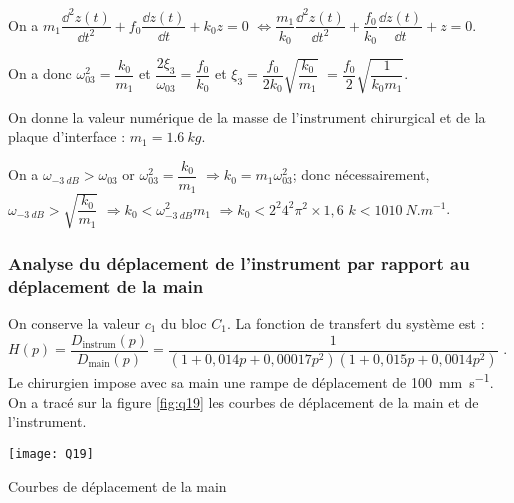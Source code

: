 \ifprof
\begin{corrige}
On a  $m_1\dfrac{\dd^2 z(t)}{\dd t^2} + f_0 \dfrac{\dd z (t)}{\dd t}+k_0 z = 0$ 
$\Leftrightarrow  \dfrac{m_1}{k_0}\dfrac{\dd^2 z(t)}{\dd t^2} + \dfrac{f_0}{k_0} \dfrac{\dd z (t)}{\dd t}+ z = 0$. 

On a donc $\omega_{03}^2=\dfrac{k_0}{m_1}$ et $\dfrac{2\xi_3}{\omega_{03}}=\dfrac{f_0}{k_0}$ et $\xi_3 =\dfrac{f_0}{2k_0}\sqrt {\dfrac{k_0}{m_1}}$ $=\dfrac{f_0}{2}\sqrt {\dfrac{1}{k_0m_1}}$.
\end{corrige}
\else
\fi

On donne la valeur numérique de la masse de l’instrument chirurgical et de la plaque d’interface : $m_1 = \SI{1,6}{kg}$.


\ifprof
\begin{corrige}
On a $ \omega_{-\SI{3}{dB}}> \omega_{03}$ or $\omega_{03}^2=\dfrac{k_0}{m_1}$ $\Rightarrow k_0= m_1 \omega_{03}^2$; donc nécessairement, $ \omega_{-\SI{3}{dB}}>\sqrt{\dfrac{k_0}{m_1}}$ $\Rightarrow k_0 <\omega_{-\SI{3}{dB}} ^2 m_1 $ $\Rightarrow k_0 <2^2 4^2 \pi^2 \times 1,6 $ $k<\SI{1010}{N.m^{-1}}$.
\end{corrige}
\else
\fi

\subsubsection*{Analyse du déplacement de l’instrument par rapport au déplacement de la main}
\ifprof
\else



On conserve la valeur $c_1$ du bloc $C_1$. La fonction de transfert du système est : $H(p)=\dfrac{D_{\text{instrum}}(p)}{D_{\text{main}}(p)}=\dfrac{1}{\left(1+0,014p+0,00017p^2 \right)\left( 1+0,015p+0,0014p^2\right)}$ .
Le chirurgien impose avec sa main une rampe de déplacement  de \SI{100}{mm.s^{-1}}. On a tracé sur la figure \ref{fig:q19} les courbes de déplacement de la main et de l’instrument.

\begin{marginfigure}
\texttt{[image: Q19]}
\caption{Courbes de déplacement de la main }
\label{fig:q19}
\end{marginfigure}
\fi

